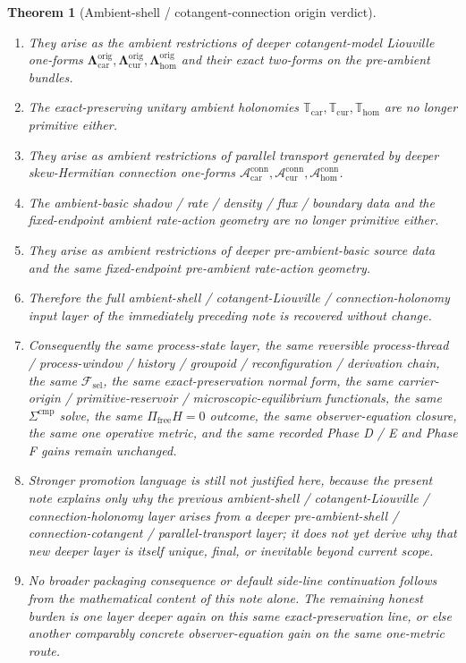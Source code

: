 \documentclass[11pt]{article}
\newcommand{\StemFunctional}{\mathscr F_{\mathrm{sel}}}
\newcommand{\TensorAmbientTransport}{\mathbb T_{\mathrm{car}}}
\newcommand{\CurAmbientTransport}{\mathbb T_{\mathrm{cur}}}
\newcommand{\HomAmbientTransport}{\mathbb T_{\mathrm{hom}}}
\newcommand{\TensorOriginLiouville}{\boldsymbol{\Lambda}_{\mathrm{car}}^{\mathrm{orig}}}
\newcommand{\CurOriginLiouville}{\boldsymbol{\Lambda}_{\mathrm{cur}}^{\mathrm{orig}}}
\newcommand{\HomOriginLiouville}{\boldsymbol{\Lambda}_{\mathrm{hom}}^{\mathrm{orig}}}
\newcommand{\TensorConnectionForm}{\mathcal A_{\mathrm{car}}^{\mathrm{conn}}}
\newcommand{\CurConnectionForm}{\mathcal A_{\mathrm{cur}}^{\mathrm{conn}}}
\newcommand{\HomConnectionForm}{\mathcal A_{\mathrm{hom}}^{\mathrm{conn}}}
\newtheorem{theorem}{Theorem}
\begin{document}
\begin{theorem}[Ambient-shell / cotangent-connection origin verdict]
\begin{enumerate}
    \item They arise as the ambient restrictions of deeper cotangent-model Liouville one-forms \(\TensorOriginLiouville,\CurOriginLiouville,\HomOriginLiouville\) and their exact two-forms on the pre-ambient bundles.
    \item The exact-preserving unitary ambient holonomies \(\TensorAmbientTransport,\CurAmbientTransport,\HomAmbientTransport\) are no longer primitive either.
    \item They arise as ambient restrictions of parallel transport generated by deeper skew-Hermitian connection one-forms \(\TensorConnectionForm,\CurConnectionForm,\HomConnectionForm\).
    \item The ambient-basic shadow / rate / density / flux / boundary data and the fixed-endpoint ambient rate-action geometry are no longer primitive either.
    \item They arise as ambient restrictions of deeper pre-ambient-basic source data and the same fixed-endpoint pre-ambient rate-action geometry.
    \item Therefore the full ambient-shell / cotangent-Liouville / connection-holonomy input layer of the immediately preceding note is recovered without change.
    \item Consequently the same process-state layer, the same reversible process-thread / process-window / history / groupoid / reconfiguration / derivation chain, the same \(\StemFunctional\), the same exact-preservation normal form, the same carrier-origin / primitive-reservoir / microscopic-equilibrium functionals, the same \(\Sigma^{\mathrm{cmp}}\) solve, the same \(\Pi_{\mathrm{free}}H=0\) outcome, the same observer-equation closure, the same one operative metric, and the same recorded Phase D / E and Phase F gains remain unchanged.
    \item Stronger promotion language is still not justified here, because the present note explains only why the previous ambient-shell / cotangent-Liouville / connection-holonomy layer arises from a deeper pre-ambient-shell / connection-cotangent / parallel-transport layer; it does not yet derive why that new deeper layer is itself unique, final, or inevitable beyond current scope.
    \item No broader packaging consequence or default side-line continuation follows from the mathematical content of this note alone. The remaining honest burden is one layer deeper again on this same exact-preservation line, or else another comparably concrete observer-equation gain on the same one-metric route.
\end{enumerate}
\end{theorem}
\end{document}
